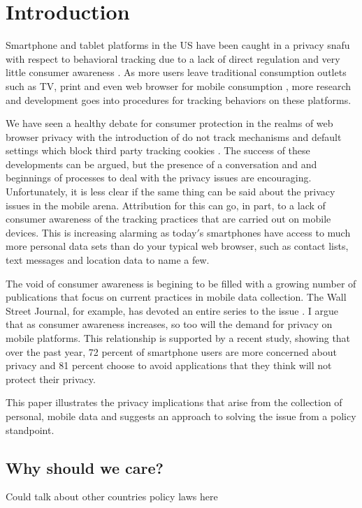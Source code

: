 \section {Introduction}

Smartphone and tablet platforms in the US have been caught in a privacy snafu with respect to behavioral tracking due to a lack of direct regulation \cite{Priv2013} and very little consumer awareness \cite{Jenn2012}. As more users leave traditional consumption outlets such as TV, print and even web browser for mobile consumption \cite{Abi2012}, more research and development goes into procedures for tracking behaviors on these platforms.

We have seen a healthy debate for consumer protection in the realms of web browser privacy with the introduction of do not track mechanisms \cite{W3C2012} and default settings which block third party tracking cookies \cite{Moz2013}. The success of these developments can be argued, 
but the presence of a conversation and and beginnings of processes to deal with the privacy issues are encouraging. 
Unfortunately, it is less clear if the same thing can be said about the privacy issues in the mobile arena. 
Attribution for this can go, in part, to a lack of consumer awareness of the tracking practices that are carried out on mobile devices\cite{?}. 
This is increasing alarming as today$'$s smartphones have access to much more personal data sets than do your typical web browser, such as contact lists, text messages and location data to name a few. 


The void of consumer awareness is begining to be filled with a growing number of publications that focus on current practices in mobile data collection. The Wall Street Journal, for example, has devoted an entire series to the issue \cite{Wsj2013}. I argue that as consumer awareness increases, so too will the demand for privacy on mobile platforms. This relationship is supported by a recent study\cite{Trust2013}, showing that over the past year, 72 percent of smartphone users are more concerned about privacy and 81 percent choose to avoid applications that they think will not protect their privacy. 

This paper illustrates the privacy implications that arise from the collection of personal, mobile data and suggests an approach to solving the issue from a policy standpoint.  

\subsection{Why should we care?}

	Could talk about other countries policy laws here

  